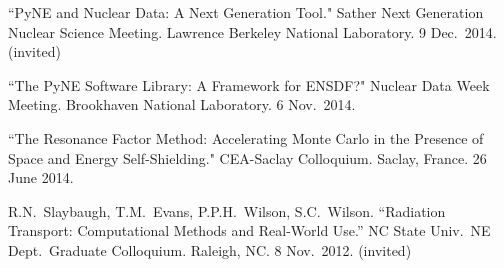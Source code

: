 \begin{bibsection}
\item ``PyNE and Nuclear Data: A Next Generation Tool." Sather Next Generation Nuclear Science Meeting. Lawrence Berkeley National Laboratory. 9 Dec.\ 2014. (invited)




\item ``The PyNE Software Library: A Framework for ENSDF?" Nuclear Data Week Meeting. Brookhaven National Laboratory. 6 Nov.\ 2014. 



\item ``The Resonance Factor Method: Accelerating Monte Carlo in the Presence of Space and Energy Self-Shielding." CEA-Saclay Colloquium. Saclay, France. 26 June 2014.



\item R.N.\ Slaybaugh, T.M.\ Evans, P.P.H.\ Wilson, S.C.\ Wilson. ``Radiation Transport: Computational Methods and Real-World Use.'' NC State Univ.\ NE Dept.\ Graduate Colloquium. Raleigh, NC. 8 Nov.\ 2012. (invited)


\end{bibsection}
